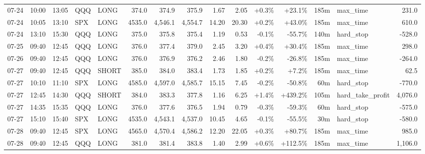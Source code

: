 \documentclass[11pt,a4paper,twoside]{article}
\begin{document}
\begin{landscape}
\begin{center}
\begin{longtable}{>{\color{txtmain}}l l l l l r r r r r r r r >{\color{txtmain}}l r}
07-24 & 10:00 & 13:05 & QQQ & LONG & 374.0 & 374.9 & 375.9 & 1.67 & 2.05 & \textcolor{wingreen}{+0.3\%} & \textcolor{wingreen}{+23.1\%} & 185m & max\_time & \textcolor{wingreen}{231.0} \\
07-24 & 10:05 & 13:10 & SPX & LONG & 4535.0 & 4,546.1 & 4,554.7 & 14.20 & 20.30 & \textcolor{wingreen}{+0.2\%} & \textcolor{wingreen}{+43.0\%} & 185m & max\_time & \textcolor{wingreen}{610.0} \\
07-24 & 13:10 & 15:30 & QQQ & LONG & 375.0 & 375.8 & 375.4 & 1.19 & 0.53 & \textcolor{lossred}{-0.1\%} & \textcolor{lossred}{-55.7\%} & 140m & hard\_stop & \textcolor{lossred}{-528.0} \\
07-25 & 09:40 & 12:45 & QQQ & LONG & 376.0 & 377.4 & 379.0 & 2.45 & 3.20 & \textcolor{wingreen}{+0.4\%} & \textcolor{wingreen}{+30.4\%} & 185m & max\_time & \textcolor{wingreen}{298.0} \\
07-26 & 09:40 & 12:45 & QQQ & LONG & 376.0 & 376.9 & 376.2 & 2.46 & 1.80 & \textcolor{lossred}{-0.2\%} & \textcolor{lossred}{-26.8\%} & 185m & max\_time & \textcolor{lossred}{-264.0} \\
07-27 & 09:40 & 12:45 & QQQ & SHORT & 385.0 & 384.0 & 383.4 & 1.73 & 1.85 & \textcolor{wingreen}{+0.2\%} & \textcolor{wingreen}{+7.2\%} & 185m & max\_time & \textcolor{wingreen}{62.5} \\
07-27 & 10:10 & 11:10 & SPX & LONG & 4585.0 & 4,597.0 & 4,585.7 & 15.15 & 7.45 & \textcolor{lossred}{-0.2\%} & \textcolor{lossred}{-50.8\%} & 60m & hard\_stop & \textcolor{lossred}{-770.0} \\
07-27 & 12:45 & 14:30 & QQQ & SHORT & 384.0 & 383.3 & 377.8 & 1.16 & 6.25 & \textcolor{wingreen}{+1.4\%} & \textcolor{wingreen}{+439.2\%} & 105m & hard\_take\_profit & \textcolor{wingreen}{4,076.0} \\
07-27 & 14:35 & 15:35 & QQQ & LONG & 376.0 & 377.6 & 376.5 & 1.94 & 0.79 & \textcolor{lossred}{-0.3\%} & \textcolor{lossred}{-59.3\%} & 60m & hard\_stop & \textcolor{lossred}{-575.0} \\
07-27 & 15:10 & 15:40 & SPX & LONG & 4535.0 & 4,543.1 & 4,537.0 & 10.45 & 4.65 & \textcolor{lossred}{-0.1\%} & \textcolor{lossred}{-55.5\%} & 30m & hard\_stop & \textcolor{lossred}{-580.0} \\
07-28 & 09:40 & 12:45 & SPX & LONG & 4565.0 & 4,570.4 & 4,586.2 & 12.20 & 22.05 & \textcolor{wingreen}{+0.3\%} & \textcolor{wingreen}{+80.7\%} & 185m & max\_time & \textcolor{wingreen}{985.0} \\
07-28 & 09:40 & 12:45 & QQQ & LONG & 381.0 & 381.4 & 383.8 & 1.40 & 2.99 & \textcolor{wingreen}{+0.6\%} & \textcolor{wingreen}{+112.5\%} & 185m & max\_time & \textcolor{wingreen}{1,106.0} \\

\end{longtable}
\end{center}
\end{landscape}
\end{document}
